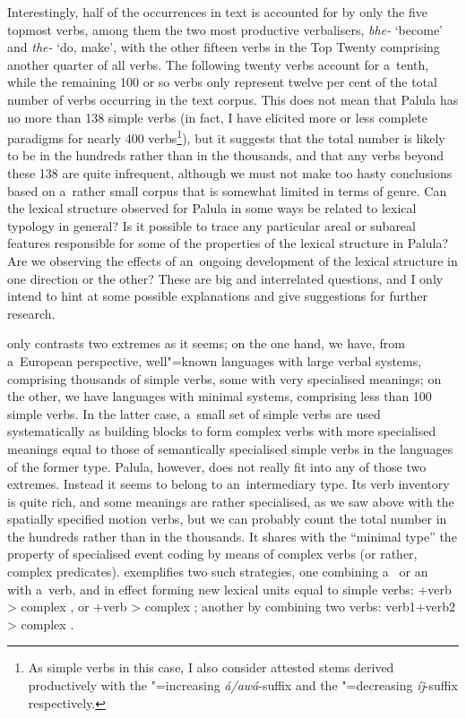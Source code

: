 Interestingly, half of the occurrences in text is accounted for by only the five topmost verbs, among them the two most productive verbalisers, \textit{bhe-} `become' and \textit{the-} `do, make', with the other fifteen verbs in the Top Twenty comprising another quarter of all verbs. The following twenty verbs account for a~tenth, while the remaining 100 or so verbs only represent twelve per cent of the total number of verbs occurring in the text corpus. This does not mean that Palula has no more than 138 simple verbs (in fact, I have elicited more or less complete paradigms for nearly 400 verbs\footnote{As simple verbs in this case, I also consider attested stems derived productively with the "=increasing \textit{á/awá}-suffix and the "=decreasing \textit{íǰ}-suffix respectively.}), but it suggests that the total number is likely to be in the hundreds rather than in the thousands, and that any verbs beyond these 138 are quite infrequent, although we must not make too hasty conclusions based on a~rather small corpus that is somewhat limited in terms of genre. Can the lexical structure observed for Palula in some ways be related to lexical typology in general? Is it possible to trace any particular areal or subareal features responsible for some of the properties of the lexical structure in Palula? Are we observing the effects of an~ongoing development of the lexical structure in one direction or the other? These are big and interrelated questions, and I only intend to hint at some possible explanations and give suggestions for further research.



\citet[409]{viberg2006} only contrasts two extremes as it seems; on the one hand, we have, from a~European perspective, well"=known languages with large verbal systems, comprising thousands of simple verbs, some with very specialised meanings; on the other, we have languages with minimal systems, comprising less than 100 simple verbs. In the latter case, a~small set of simple verbs are used systematically as building blocks to form complex verbs with more specialised meanings equal to those of semantically specialised simple verbs in the languages of the former type. Palula, however, does not really fit into any of those two extremes. Instead it seems to belong to an~intermediary type. Its verb inventory is quite rich, and some meanings are rather specialised, as we saw above with the spatially specified motion verbs, but we can probably count the total number in the hundreds rather than in the thousands. It shares with the ``minimal type'' the property of specialised event coding by means of complex verbs (or rather, complex predicates). \citet[348]{viberg2006} exemplifies two such strategies, one combining a~ or an~ with a~verb, and in effect forming new lexical units equal to simple verbs: +verb {\textgreater} complex , or +verb {\textgreater} complex ; another by combining two verbs: verb1+verb2 {\textgreater} complex . 



